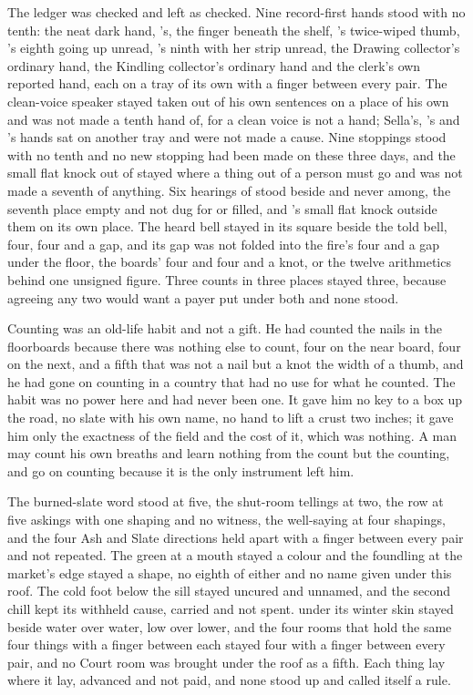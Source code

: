 The ledger was checked and left as checked. Nine record-first hands stood with no tenth: the neat dark hand, 's, the finger beneath the shelf, 's twice-wiped thumb, 's eighth going up unread, 's ninth with her strip unread, the Drawing collector's ordinary hand, the Kindling collector's ordinary hand and the clerk's own reported hand, each on a tray of its own with a finger between every pair. The clean-voice speaker stayed taken out of his own sentences on a place of his own and was not made a tenth hand of, for a clean voice is not a hand; Sella's, 's and 's hands sat on another tray and were not made a cause. Nine stoppings stood with no tenth and no new stopping had been made on these three days, and the small flat knock out of  stayed where a thing out of a person must go and was not made a seventh of anything. Six hearings of  stood beside and never among, the seventh place empty and not dug for or filled, and 's small flat knock outside them on its own place. The heard bell stayed in its square beside the told bell, four, four and a gap, and its gap was not folded into the fire's four and a gap under the floor, the boards' four and four and a knot, or the twelve arithmetics behind one unsigned figure. Three counts in three places stayed three, because agreeing any two would want a payer put under both and none stood.

Counting was an old-life habit and not a gift. He had counted the nails in the floorboards because there was nothing else to count, four on the near board, four on the next, and a fifth that was not a nail but a knot the width of a thumb, and he had gone on counting in a country that had no use for what he counted. The habit was no power here and had never been one. It gave him no key to a box up the road, no slate with his own name, no hand to lift a crust two inches; it gave him only the exactness of the field and the cost of it, which was nothing. A man may count his own breaths and learn nothing from the count but the counting, and go on counting because it is the only instrument left him.

The burned-slate word stood at five, the shut-room tellings at two, the row at five askings with one shaping and no witness, the well-saying at four shapings, and the four Ash and Slate directions held apart with a finger between every pair and not repeated. The green at a mouth stayed a colour and the foundling at the market's edge stayed a shape, no eighth of either and no name given under this roof. The cold foot below the sill stayed uncured and unnamed, and the second chill kept its withheld cause, carried and not spent.  under its winter skin stayed beside water over water, low over lower, and the four rooms that hold the same four things with a finger between each stayed four with a finger between every pair, and no Court room was brought under the roof as a fifth. Each thing lay where it lay, advanced and not paid, and none stood up and called itself a rule.

